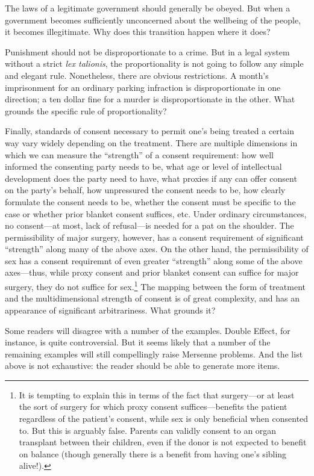 The laws of a legitimate government should generally be obeyed. But when a government becomes sufficiently unconcerned
about the wellbeing of the people, it becomes illegitimate. Why does this transition happen where it does?

Punishment should not be disproportionate to a crime. But in a legal system without a strict \textit{lex talionis}, the
proportionality is not going to follow any simple and elegant rule. Nonetheless, there are obvious restrictions. 
A month's imprisonment for an ordinary parking infraction is disproportionate in one direction; a ten dollar fine
for a murder is disproportionate in the other. What grounds the specific rule of proportionality?

Finally, standards of consent necessary to permit one's being treated a certain way vary widely depending on the treatment.
There are multiple dimensions in which we can measure the ``strength'' of a consent requirement: how well informed the 
consenting party needs to be, what age or level of intellectual development does the party need to have, what proxies if
any can offer consent on the party's behalf, how unpressured the consent needs to be, how clearly formulate the consent
needs to be, whether the consent must be specific to the case or whether prior blanket consent suffices, etc.
Under ordinary circumstances, no consent---at most, lack of refusal---is needed for a pat on the shoulder. The permissibility
of major surgery, however, has a consent requirement of significant ``strength'' along many of the above axes. On the other hand,
the permissibility of sex has a consent requiremnt of even greater ``strength'' along some of the above axes---thus, while
proxy consent and prior blanket consent can suffice for major surgery, they do not suffice for sex.\footnote{It is tempting
to explain this in terms of the fact that surgery---or at least the sort of surgery for which proxy consent suffices---benefits 
the patient regardless of the patient's consent, while sex is only beneficial when consented to. But this is arguably false.
Parents can validly consent to an organ transplant between their children, even if the donor is not expected to benefit
on balance (though generally there is a benefit from having one's sibling alive!).} The mapping between
the form of treatment and the multidimensional strength of consent is of great complexity, and has an appearance of significant
arbitrariness. What grounds it?

Some readers will disagree with a number of the examples. Double Effect, for instance, is quite controversial. But it seems
likely that a number of the remaining examples will still compellingly raise Mersenne problems. And the list above is not
exhaustive: the reader should be able to generate more items.

